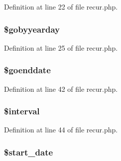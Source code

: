 \-Definition at line 22 of file recur.\-php.

\hypertarget{class_when_a500ec70777161d3066e95f7c7551b7a3}{
\subsubsection[{\$gobyyearday}]{\setlength{\rightskip}{0pt plus 5cm}\$gobyyearday}}\label{class_when_a500ec70777161d3066e95f7c7551b7a3}


\-Definition at line 25 of file recur.\-php.

\hypertarget{class_when_a68d1d0dd2c7af0521842477b901d2ce2}{
\subsubsection[{\$goenddate}]{\setlength{\rightskip}{0pt plus 5cm}\$goenddate}}\label{class_when_a68d1d0dd2c7af0521842477b901d2ce2}


\-Definition at line 42 of file recur.\-php.

\hypertarget{class_when_a02df6fd14302ba88fecc15b95d513e5b}{
\subsubsection[{\$interval}]{\setlength{\rightskip}{0pt plus 5cm}\${\bf interval}}}\label{class_when_a02df6fd14302ba88fecc15b95d513e5b}


\-Definition at line 44 of file recur.\-php.

\hypertarget{class_when_a6720ff61744e00a5bbbaa98676e7beb5}{
\subsubsection[{\$start\-\_\-date}]{\setlength{\rightskip}{0pt plus 5cm}\$start\-\_\-date}}\label{class_when_a6720ff61744e00a5bbbaa98676e7beb5}



